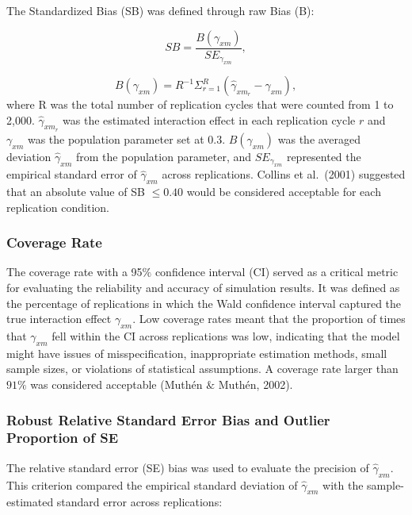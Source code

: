 \documentclass[
  man]{apa6}
\begin{document}
The Standardized Bias (SB) was defined through raw Bias (B):

\begin{equation}
SB = \frac{B(\gamma_{xm})}{SE_{\gamma_{xm}}},
\end{equation}

\begin{equation}
B(\gamma_{xm}) = R^{-1}\Sigma^{R}_{r = 1}(\hat{\gamma}_{xm_{r}} - \gamma_{xm}),
\end{equation}
where R was the total number of replication cycles that were counted from 1 to 2,000. \(\hat{\gamma}_{xm_{r}}\) was the estimated interaction effect in each replication cycle \(r\) and \(\gamma_{xm}\) was the population parameter set at 0.3. \(B(\gamma_{xm})\) was the averaged deviation \(\hat{\gamma}_{xm}\) from the population parameter, and \(SE_{\gamma_{xm}}\) represented the empirical standard error of \(\hat{\gamma}_{xm}\) across replications. Collins et al.~(2001) suggested that an absolute value of SB \(\le 0.40\) would be considered acceptable for each replication condition.

\hypertarget{coverage-rate}{%
\subsubsection{Coverage Rate}\label{coverage-rate}}

The coverage rate with a 95\(\%\) confidence interval (CI) served as a critical metric for evaluating the reliability and accuracy of simulation results. It was defined as the percentage of replications in which the Wald confidence interval captured the true interaction effect \(\gamma_{xm}\). Low coverage rates meant that the proportion of times that \(\gamma_{xm}\) fell within the CI across replications was low, indicating that the model might have issues of misspecification, inappropriate estimation methods, small sample sizes, or violations of statistical assumptions. A coverage rate larger than \(91\%\) was considered acceptable (Muthén \(\&\) Muthén, 2002).

\hypertarget{robust-relative-standard-error-bias-and-outlier-proportion-of-se}{%
\subsubsection{Robust Relative Standard Error Bias and Outlier Proportion of SE}\label{robust-relative-standard-error-bias-and-outlier-proportion-of-se}}

The relative standard error (SE) bias was used to evaluate the precision of \(\hat{\gamma}_{xm}\). This criterion compared the empirical standard deviation of \(\hat{\gamma}_{xm}\) with the sample-estimated standard error across replications:
\end{document}
